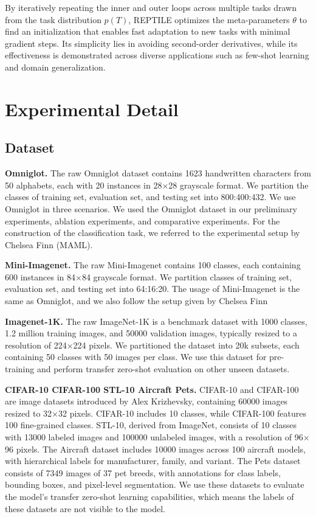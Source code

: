 By iteratively repeating the inner and outer loops across multiple tasks drawn from the task distribution \( p({T}) \), REPTILE optimizes the meta-parameters \( \theta \) to find an initialization that enables fast adaptation to new tasks with minimal gradient steps. Its simplicity lies in avoiding second-order derivatives, while its effectiveness is demonstrated across diverse applications such as few-shot learning and domain generalization.

\clearpage
\section{Experimental Detail}\label{sec:appendix_4}
\subsection{Dataset}\label{sec:dataset setup}
\noindent\textbf{Omniglot.}
The raw Omniglot dataset contains 1623 handwritten characters from 50 alphabets, each with 20 instances in 28$\times$28 grayscale format. We partition the classes of training set, evaluation set, and testing set into 800:400:432. We use Omniglot in three scenarios. We used the Omniglot dataset in our preliminary experiments, ablation experiments, and comparative experiments. For the construction of the classification task, we referred to the experimental setup by Chelsea Finn \etal (MAML).
\\
\par
\noindent\textbf{Mini-Imagenet.}
The raw Mini-Imagenet contains 100 classes, each containing 600 instances in 84$\times$84 grayscale format. We partition classes of training set, evaluation set, and testing set into 64:16:20. The usage of Mini-Imagenet is the same as Omniglot, and we also follow the setup given by Chelsea Finn \etal
\\
\par
\noindent\textbf{Imagenet-1K.}
The raw ImageNet-1K is a benchmark dataset with 1000 classes, 1.2 million training images, and 50000 validation images, typically resized to a resolution of 224$\times$224 pixels. We partitioned the dataset into 20k subsets, each containing 50 classes with 50 images per class. We use this dataset for pre-training and perform transfer zero-shot evaluation on other unseen datasets.
\\
\par
\noindent\textbf{CIFAR-10 CIFAR-100 STL-10 Aircraft Pets.}
CIFAR-10 and CIFAR-100 are image datasets introduced by Alex Krizhevsky, containing 60000 images resized to 32$\times$32 pixels. CIFAR-10 includes 10 classes, while CIFAR-100 features 100 fine-grained classes. STL-10, derived from ImageNet, consists of 10 classes with 13000 labeled images and 100000 unlabeled images, with a resolution of 96$\times$96 pixels. The Aircraft dataset includes 10000 images across 100 aircraft models, with hierarchical labels for manufacturer, family, and variant. The Pets dataset consists of 7349 images of 37 pet breeds, with annotations for class labels, bounding boxes, and pixel-level segmentation. We use these datasets to evaluate the model's transfer zero-shot learning capabilities, which means the labels of these datasets are not visible to the model.
